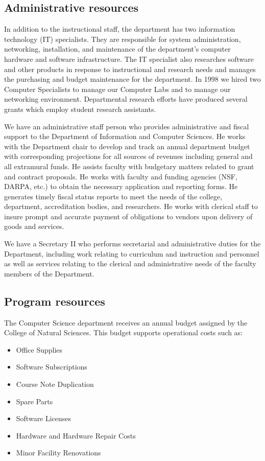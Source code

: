 \documentclass[12pt]{article}
\begin{document}
\subsection{Administrative resources}

In addition to the instructional staff, the department has two information
technology (IT) specialists. They are responsible for system
administration, networking, installation, and maintenance of the
department’s computer hardware and software infrastructure. The IT
specialist also researches software and other products in response to
instructional and research needs and manages the purchasing and budget
maintenance for the department. In 1998 we hired two Computer
Specialists to manage our Computer Labs and to manage our networking
environment. Departmental research efforts
have produced several grants which employ student research assistants.

We have an administrative staff person who provides administrative and fiscal support to the
Department of Information and Computer Sciences. He works with the
Department chair to develop and track an annual department budget with
corresponding projections for all sources of revenues including general and
all extramural funds. He assists faculty with budgetary matters related to
grant and contract proposals. He works with faculty and funding agencies
(NSF, DARPA, etc.) to obtain the necessary application and reporting
forms. He generates timely fiscal status reports to meet the needs of the
college, department, accreditation bodies, and researchers. He works with
clerical staff to insure prompt and accurate payment of obligations to
vendors upon delivery of goods and services.

We have a Secretary II who performs secretarial and administrative
duties for the Department, including work relating to curriculum and
instruction and personnel as well as services relating to the clerical and
administrative needs of the faculty members of the Department.

\subsection{Program resources}

The Computer Science department receives an annual budget assigned by the
College of Natural Sciences. This budget supports operational costs such
as:
\begin{itemize}
\item Office Supplies
\item Software Subscriptions
\item Course Note Duplication
\item Spare Parts
\item Software Licenses
\item Hardware and Hardware Repair Costs
\item Minor Facility Renovations
\end{itemize}
\end{document}
